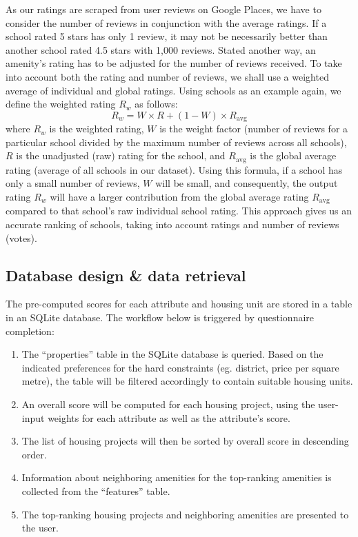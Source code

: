 \documentclass[a4paper, 11pt]{article}
\begin{document}
As our ratings are scraped from user reviews on Google Places, we have to consider the number of reviews in conjunction with the average ratings. If a school rated 5 stars has only 1 review, it may not be necessarily better than another school rated 4.5 stars with 1,000 reviews. Stated another way, an amenity's rating has to be adjusted for the number of reviews received. To take into account both the rating and number of reviews, we shall use a weighted average of individual and global ratings. Using schools as an example again, we define the weighted rating $R_w$ as follows:
\[ R_w = W\times R +(1-W)\times R_{\text{avg}}\] where $R_w$ is the weighted rating, $W$ is the weight factor (number of reviews for a particular school divided by the maximum number of reviews across all schools), $R$ is the unadjusted (raw) rating for the school, and $R_{\text{avg}}$ is the global average rating (average of all schools in our dataset). Using this formula, if a school has only a small number of reviews, $W$ will be small, and consequently, the output rating $R_w$ will have a larger contribution from the global average rating $R_{\text{avg}}$ compared to that school's raw individual school rating. This approach gives us an accurate ranking of schools, taking into account ratings and number of reviews (votes).

\subsection{Database design \& data retrieval}

The pre-computed scores for each attribute and housing unit are stored in a table in an SQLite database. The workflow below is triggered by questionnaire completion:

\begin{enumerate}
    \item The “properties” table in the SQLite database is queried. Based on the indicated preferences for the hard constraints (eg. district, price per square metre), the table will be filtered accordingly to contain suitable housing units.
    \item An overall score will be computed for each housing project, using the user-input weights for each attribute as well as the attribute’s score.
    \item The list of housing projects will then be sorted by overall score in descending order.
    \item Information about neighboring amenities for the top-ranking amenities is collected from the “features” table.
    \item The top-ranking housing projects and neighboring amenities are presented to the user.
\end{enumerate}
\end{document}
